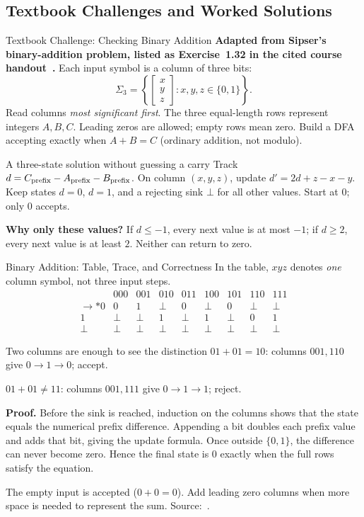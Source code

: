 \documentclass[10pt]{beamer}
\begin{document}
\subsection{Textbook Challenges and Worked Solutions}

\begin{frame}{Textbook Challenge: Checking Binary Addition}
  \small
  \textbf{Adapted from Sipser's binary-addition problem, listed as
  Exercise~1.32 in the cited course handout~\cite{addition-source}.}
  Each input symbol is a column of three bits:
  \[
    \Sigma_3=\left\{\begin{bmatrix}x\\y\\z\end{bmatrix}:x,y,z\in\{0,1\}\right\}.
  \]
  Read columns \emph{most significant first}. The three equal-length rows
  represent integers $A,B,C$. Leading zeros are allowed; empty rows mean zero.
  Build a DFA accepting exactly when $A+B=C$ (ordinary addition, not modulo).
  \pause
  \begin{block}{A three-state solution without guessing a carry}
    Track $d=C_{\rm prefix}-A_{\rm prefix}-B_{\rm prefix}$.
    On column $(x,y,z)$, update $d'=2d+z-x-y$.
    Keep states $d=0$, $d=1$, and a rejecting sink $\bot$ for all other values.
    Start at $0$; only $0$ accepts.
  \end{block}
  \textbf{Why only these values?} If $d\le-1$, every next value is at most
  $-1$; if $d\ge2$, every next value is at least $2$. Neither can return to zero.
\end{frame}

\begin{frame}{Binary Addition: Table, Trace, and Correctness}
  \small
  In the table, $xyz$ denotes \emph{one} column symbol, not three input steps.
  \[
    \begin{array}{c|cccccccc}
      &000&001&010&011&100&101&110&111\\\hline
      \to *0&0&1&\bot&0&\bot&0&\bot&\bot\\
      1&\bot&\bot&1&\bot&1&\bot&0&1\\
      \bot&\bot&\bot&\bot&\bot&\bot&\bot&\bot&\bot
    \end{array}
  \]
  \pause
  \begin{exampleblock}{Two columns are enough to see the distinction}
    $01+01=10$: columns $001,110$ give $0\to1\to0$; accept.
    \par\smallskip
    $01+01\ne11$: columns $001,111$ give $0\to1\to1$; reject.
  \end{exampleblock}
  \pause
  \textbf{Proof.} Before the sink is reached, induction on the columns shows
  that the state equals the numerical prefix difference. Appending a bit
  doubles each prefix value and adds that bit, giving the update formula.
  Once outside $\{0,1\}$, the difference can never become zero.
  Hence the final state is $0$ exactly when the full rows satisfy the equation.
  \par\smallskip
  The empty input is accepted ($0+0=0$). Add leading zero columns when
  more space is needed to represent the sum. Source:~\cite{addition-source}.
\end{frame}
\end{document}
